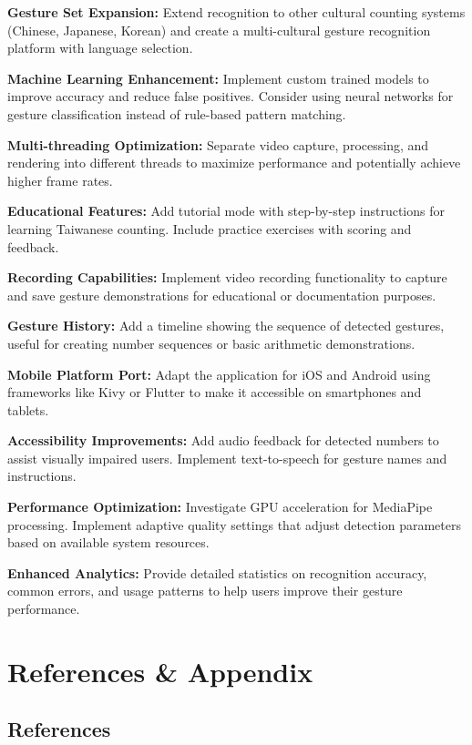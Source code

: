 \documentclass{article}
\begin{document}
\textbf{Gesture Set Expansion:} Extend recognition to other cultural counting systems (Chinese, Japanese, Korean) and create a multi-cultural gesture recognition platform with language selection.

\textbf{Machine Learning Enhancement:} Implement custom trained models to improve accuracy and reduce false positives. Consider using neural networks for gesture classification instead of rule-based pattern matching.

\textbf{Multi-threading Optimization:} Separate video capture, processing, and rendering into different threads to maximize performance and potentially achieve higher frame rates.

\textbf{Educational Features:} Add tutorial mode with step-by-step instructions for learning Taiwanese counting. Include practice exercises with scoring and feedback.

\textbf{Recording Capabilities:} Implement video recording functionality to capture and save gesture demonstrations for educational or documentation purposes.

\textbf{Gesture History:} Add a timeline showing the sequence of detected gestures, useful for creating number sequences or basic arithmetic demonstrations.

\textbf{Mobile Platform Port:} Adapt the application for iOS and Android using frameworks like Kivy or Flutter to make it accessible on smartphones and tablets.

\textbf{Accessibility Improvements:} Add audio feedback for detected numbers to assist visually impaired users. Implement text-to-speech for gesture names and instructions.

\textbf{Performance Optimization:} Investigate GPU acceleration for MediaPipe processing. Implement adaptive quality settings that adjust detection parameters based on available system resources.

\textbf{Enhanced Analytics:} Provide detailed statistics on recognition accuracy, common errors, and usage patterns to help users improve their gesture performance.



\section{References \& Appendix}

\subsection*{References}
\end{document}

